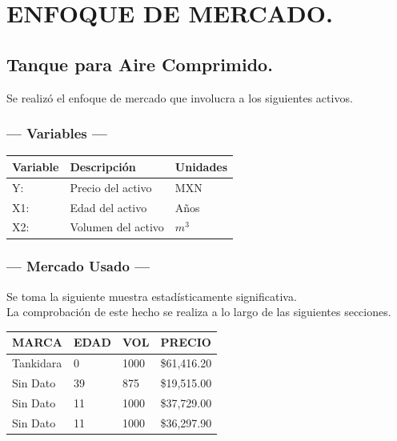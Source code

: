 \chapter{ENFOQUE DE MERCADO.} %

\section{Tanque para Aire Comprimido.} %
Se realizó el enfoque de mercado que involucra a los siguientes activos.

\subsection{\centering --- Variables ---} %
\begin{center}
  \begin{tabular}{|l|l|l|}
    \hline 
    Variable & Descripción   & Unidades\\ \hline 
    Y:  & Precio del activo  & MXN \\ \hline 
    X1: & Edad del activo    & Años \\ \hline 
		X2: & Volumen del activo & \(m ^ 3\) \\ \hline 
  \end{tabular}
\end{center} 

\subsection{\centering --- Mercado Usado ---} %
Se toma la siguiente muestra estadísticamente significativa. \\ 
La comprobación de este hecho se realiza a lo largo de las siguientes secciones.
\begin{center}
	\begin{tabular}{*{4}{|p{2cm}}|}
		\hline 
		MARCA     & EDAD &  VOL   & PRECIO \\ \hline 
		Tankidara & 0    &  1000  & \$61,416.20 \\ \hline 
		Sin Dato  & 39   &  875   & \$19,515.00 \\ \hline 
		Sin Dato  & 11   &  1000  & \$37,729.00 \\ \hline 
		Sin Dato  & 11   &  1000  & \$36,297.90 \\ \hline
	\end{tabular}
\end{center}

